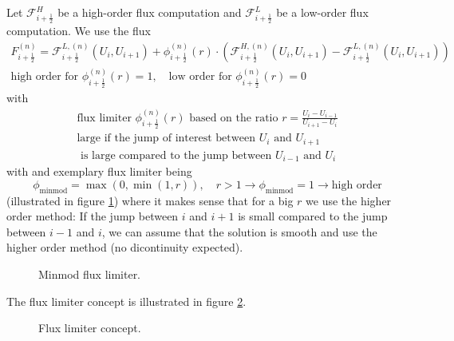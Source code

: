 Let $\mathcal{F}^H_{i+\frac{1}{2}}$ be a high-order flux computation and $\mathcal{F}^L_{i+\frac{1}{2}}$ be a low-order flux computation.
We use the flux
\begin{equation}
    \begin{gathered}
        F_{i+\frac{1}{2}}^{(n)}=\mathcal{F}_{i+\frac{1}{2}}^{L,(n)}\left(U_i, U_{i+1}\right)+\phi_{i+\frac{1}{2}}^{(n)}(r) \cdot\left(\mathcal{F}_{i+\frac{1}{2}}^{H,(n)}\left(U_i, U_{i+1}\right)-\mathcal{F}_{i+\frac{1}{2}}^{L,(n)}\left(U_i, U_{i+1}\right)\right) \\
        \text{high order for } \phi_{i+\frac{1}{2}}^{(n)}(r) = 1, \quad \text{low order for } \phi_{i+\frac{1}{2}}^{(n)}(r) = 0
    \end{gathered}
\end{equation}
with
\begin{equation}
    \begin{gathered}
        \text{flux limiter } \phi_{i+\frac{1}{2}}^{(n)}(r) \text{ based on the ratio } r = \frac{U_i - U_{i-1}}{U_{i+1} - U_{i}} \\
        \text{large if the jump of interest between } U_i \text{ and } U_{i+1} \\
        \text{ is large compared to the jump between } U_{i-1} \text{ and } U_{i}
    \end{gathered}
\end{equation}
with and exemplary flux limiter being
\begin{equation}
    \phi_{\text{minmod}} = \max(0, \min(1, r)), \quad r > 1 \rightarrow \phi_{\text{minmod}} = 1 \rightarrow \text{high order}
\end{equation}
(illustrated in figure \ref{fig:minmod}) where it makes sense that for a big $r$ we use the higher order method: \textcolor{blue1}{If the jump between $i$ and $i+1$ is small compared to the jump between $i-1$ and $i$, we can assume that the solution is smooth and use the higher order method (no dicontinuity expected).}

\begin{figure}[htb!]
    \centering
    
    \caption{Minmod flux limiter.}
    \label{fig:minmod}
\end{figure}

The flux limiter concept is illustrated in figure \ref{fig:flux_limiter}.

\begin{figure}[htb!]
    \centering
    
    \caption{Flux limiter concept.}
    \label{fig:flux_limiter}
\end{figure}

